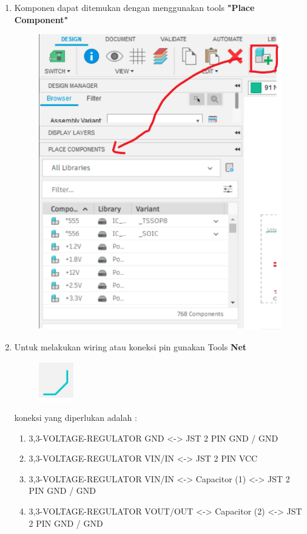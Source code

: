 \begin{enumerate}
    \item Komponen dapat ditemukan dengan menggunakan tools \textbf{"Place Component"}
        \begin{figure}[H]
            \centering
            \includegraphics[width=0.7\linewidth]{P1/img/placecomponent.png}
        \end{figure}
    \item Untuk melakukan wiring atau koneksi pin gunakan Tools \textbf{Net} 
        \begin{figure}[H]
            \centering
            \includegraphics[width=0.2\linewidth]{P1/img/net.png}
        \end{figure}
    koneksi yang diperlukan adalah :
    \begin{enumerate}
        \item 3,3-VOLTAGE-REGULATOR GND <-> JST 2 PIN GND / GND
        \item 3,3-VOLTAGE-REGULATOR VIN/IN <-> JST 2 PIN VCC
        \item 3,3-VOLTAGE-REGULATOR VIN/IN <-> Capacitor (1) <-> JST 2 PIN GND / GND
        \item 3,3-VOLTAGE-REGULATOR VOUT/OUT <-> Capacitor (2) <-> JST 2 PIN GND / GND

\end{enumerate}
\end{enumerate}
